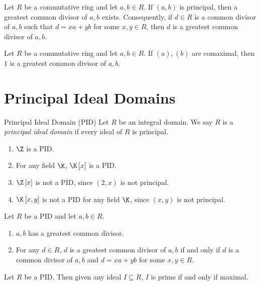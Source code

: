 \documentclass[pmath347]{subfiles}
\begin{document}
    \begin{cor}{}
        Let $R$ be a commutative ring and let $a,b\in R$. If $\left( a,b \right)$ is principal, then a greatest common divisor of $a,b$ exists. Consequently, if $d\in R$ is a common divisor of $a,b$ such that $d=xa+yb$ for some $x,y\in R$, then $d$ is a greatest common divisor of $a,b$.
    \end{cor}	

    \begin{cor}{}
        Let $R$ be a commutative ring and let $a,b\in R$. If $\left( a \right) , \left( b \right)$ are comaximal, then $1$ is a greatest common divisor of $a,b$.
    \end{cor}	

    \clearpage
    \section{Principal Ideal Domains}

    \begin{definition}{Principal Ideal Domain (PID)}{}
        Let $R$ be an integral domain. We say $R$ is a \emph{principal ideal domain} if every ideal of $R$ is principal.
    \end{definition}
    
    \ex
    \begin{enumerate}
        \item $\Z$ is a PID.
        \item For any field $\K$, $\K\left[ x \right]$ is a PID.
        \item $\Z\left[ x \right]$ is not a PID, since $\left( 2,x \right)$ is not principal.
        \item $\K\left[ x,y \right]$ is not a PID for any field $\K$, since $\left( x,y \right)$ is not principal.
    \end{enumerate}

    \begin{prop}{}
        Let $R$ be a PID and let $a,b\in R$.
        \begin{enumerate}
            \item $a,b$ has a greatest common divisor.
            \item For any $d\in R$, $d$ is a greatest common divisor of $a,b$ if and only if $d$ is a common divisor of $a,b$ and $d=xa+yb$ for some $x,y\in R$.
        \end{enumerate}
    \end{prop}

    \begin{prop}{}
        Let $R$ be a PID. Then given any ideal $I\subseteq R$, $I$ is prime if and only if maximal.
    \end{prop}
\end{document}
